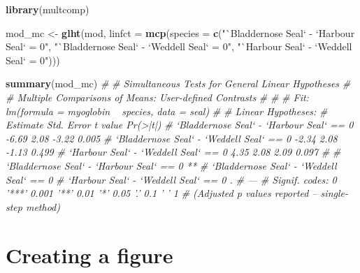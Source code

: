 \documentclass[
]{book}
\newenvironment{Shaded}{\begin{snugshade}}{\end{snugshade}}
\newcommand{\CommentTok}[1]{\textcolor[rgb]{0.56,0.35,0.01}{\textit{#1}}}
\newcommand{\DataTypeTok}[1]{\textcolor[rgb]{0.13,0.29,0.53}{#1}}
\newcommand{\KeywordTok}[1]{\textcolor[rgb]{0.13,0.29,0.53}{\textbf{#1}}}
\newcommand{\NormalTok}[1]{#1}
\newcommand{\StringTok}[1]{\textcolor[rgb]{0.31,0.60,0.02}{#1}}
\begin{document}
\begin{Shaded}
\begin{Highlighting}[]
\KeywordTok{library}\NormalTok{(multcomp)}
\end{Highlighting}
\end{Shaded}

\begin{Shaded}
\begin{Highlighting}[]
\NormalTok{mod_mc <-}\StringTok{ }\KeywordTok{glht}\NormalTok{(mod, }\DataTypeTok{linfct =} \KeywordTok{mcp}\NormalTok{(}\DataTypeTok{species =} \KeywordTok{c}\NormalTok{(}\StringTok{"`Bladdernose Seal` - `Harbour Seal` = 0"}\NormalTok{, }
                                             \StringTok{"`Bladdernose Seal` - `Weddell Seal` = 0"}\NormalTok{,}
                                             \StringTok{"`Harbour Seal` - `Weddell Seal` = 0"}\NormalTok{)))}

\KeywordTok{summary}\NormalTok{(mod_mc)}
\CommentTok{# }
\CommentTok{#    Simultaneous Tests for General Linear Hypotheses}
\CommentTok{# }
\CommentTok{# Multiple Comparisons of Means: User-defined Contrasts}
\CommentTok{# }
\CommentTok{# }
\CommentTok{# Fit: lm(formula = myoglobin ~ species, data = seal)}
\CommentTok{# }
\CommentTok{# Linear Hypotheses:}
\CommentTok{#                                          Estimate Std. Error t value Pr(>|t|)}
\CommentTok{# `Bladdernose Seal` - `Harbour Seal` == 0    -6.69       2.08   -3.22    0.005}
\CommentTok{# `Bladdernose Seal` - `Weddell Seal` == 0    -2.34       2.08   -1.13    0.499}
\CommentTok{# `Harbour Seal` - `Weddell Seal` == 0         4.35       2.08    2.09    0.097}
\CommentTok{#                                            }
\CommentTok{# `Bladdernose Seal` - `Harbour Seal` == 0 **}
\CommentTok{# `Bladdernose Seal` - `Weddell Seal` == 0   }
\CommentTok{# `Harbour Seal` - `Weddell Seal` == 0     . }
\CommentTok{# ---}
\CommentTok{# Signif. codes:  0 '***' 0.001 '**' 0.01 '*' 0.05 '.' 0.1 ' ' 1}
\CommentTok{# (Adjusted p values reported -- single-step method)}
\end{Highlighting}
\end{Shaded}

\hypertarget{creating-a-figure-2}{%
\section{Creating a figure}\label{creating-a-figure-2}}
\end{document}
